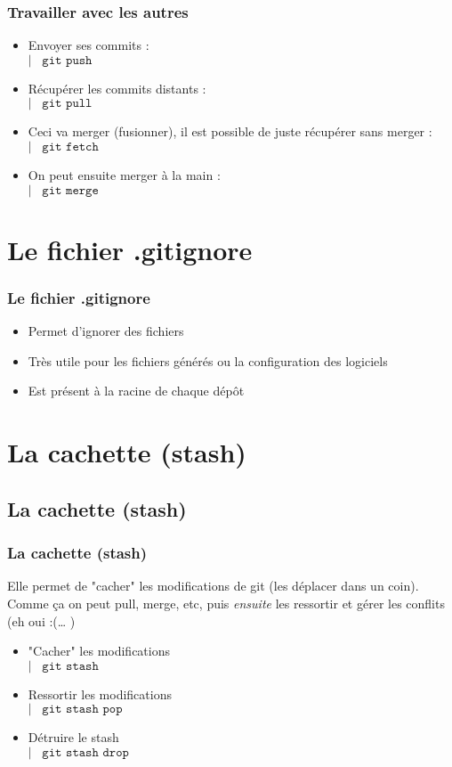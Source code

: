 \documentclass[9pt,a9paper,handout]{beamer}
\newcommand{\command}[1]{$\left|\;\;\;\texttt{#1}\right.$}
\begin{document}
\begin{frame}
\frametitle{Travailler avec les autres}
\begin{itemize}
    \item Envoyer ses commits : \\\command{git push}
    \item Récupérer les commits distants : \\\command{git pull}\\
    \item Ceci va merger (fusionner), il est possible de juste récupérer sans merger :\\\command{git fetch}
    \item On peut ensuite merger à la main :\\\command{git merge}
\end{itemize}
\end{frame}

\section{Le fichier .gitignore}
\begin{frame}
\frametitle{Le fichier .gitignore}
\begin{itemize}
    \item Permet d'ignorer des fichiers
    \item Très utile pour les fichiers générés ou la configuration des logiciels
    \item Est présent à la racine de chaque dépôt
\end{itemize}
\end{frame}

\section{La cachette (stash)}
\subsection{La cachette (stash)}
\begin{frame}
\frametitle{La cachette (stash)}
Elle permet de "cacher" les modifications de git (les déplacer dans un coin). Comme ça on peut pull, merge, etc, puis \emph{ensuite} les ressortir et gérer les conflits (eh oui :(… )
\begin{itemize}
    \item "Cacher" les modifications\\\command{git stash}
    \item Ressortir les modifications\\\command{git stash pop}
    \item Détruire le stash\\\command{git stash drop}
\end{itemize}
\end{frame}
\end{document}
